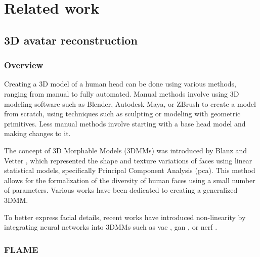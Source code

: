 \section{Related work}
\label{sec:related-work}

\subsection{3D avatar reconstruction}

\subsubsection{Overview}


Creating a 3D model of a human head can be done using various methods, ranging from manual to fully automated. Manual methods involve using 3D modeling software such as Blender, Autodesk Maya, or ZBrush to create a model from scratch, using techniques such as sculpting or modeling with geometric primitives. Less manual methods involve starting with a base head model and making changes to it.

The concept of 3D Morphable Models (3DMMs) was introduced by Blanz and Vetter \cite{blanzMorphableModelSynthesis1999}, which represented the shape and texture variations of faces using linear statistical models, specifically Principal Component Analysis (\acrshort{pca}). This method allows for the formalization of the diversity of human faces using a small number of parameters. Various works \cite{paysan3DFaceModel2009,gerigMorphableFaceModels2018,caoFaceWarehouse3DFacial2014,liLearningModelFacial2017,yangFaceScapeLargeScaleHigh2020} have been dedicated to creating a generalized 3DMM.

To better express facial details, recent works have introduced non-linearity by integrating neural networks into 3DMMs such as \acrshort{vae} \cite{ranjanGenerating3DFaces2018}, \acrshort{gan} \cite{gecerFastGANFITGenerativeAdversarial2022}, or \acrshort{nerf} \cite{galanakis3DMMRFConvolutionalRadiance2023,hongHeadNeRFRealTimeNeRFBased2022}.

\subsubsection{FLAME}

